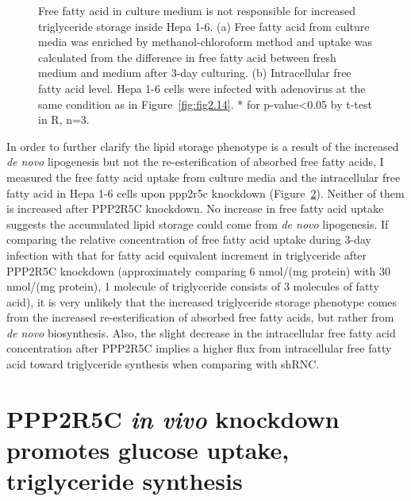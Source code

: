 \begin{figure}[!tb]
\begin{subfigure}[t]{0.48\textwidth}
    \label{fig:fig2.19b}
	\end{subfigure}
\caption[Free Fatty Acid uptake is not responsible for increased triglyceride]{\footnotesize Free fatty acid in culture medium is not responsible for increased triglyceride storage inside Hepa 1-6. (a) Free fatty acid from culture media was enriched by methanol-chloroform method \cite{folch_simple_1957} and uptake was calculated from the difference in free fatty acid between fresh medium and medium after 3-day culturing. (b) Intracellular free fatty acid level. Hepa 1-6 cells were infected with adenovirus at the same condition as in Figure~\ref{fig:fig2.14}. * for p-value<0.05 by t-test in R, n=3.}
\label{fig:fig2.19}
\end{figure}

In order to further clarify the lipid storage phenotype is a result of the increased \textit{de novo} lipogenesis but not the re-esterification of absorbed free fatty acids, I measured the free fatty acid uptake from culture media and the intracellular free fatty acid in Hepa 1-6 cells upon \gls{ppp2r5c} knockdown (Figure~\ref{fig:fig2.19}). Neither of them is increased after PPP2R5C knockdown. No increase in free fatty acid uptake suggests the accumulated lipid storage could come from \textit{de novo} lipogenesis. If comparing the relative concentration of free fatty acid uptake during 3-day infection with that for fatty acid equivalent increment in triglyceride after PPP2R5C knockdown (approximately comparing 6 nmol/(mg protein) with 30 nmol/(mg protein), 1 molecule of triglyceride consists of 3 molecules of fatty acid), it is very unlikely that the increased triglyceride storage phenotype comes from the increased re-esterification of absorbed free fatty acids, but rather from \textit{de novo} biosynthesis. Also, the slight decrease in the intracellular free fatty acid concentration after PPP2R5C implies a higher flux from intracellular free fatty acid toward triglyceride synthesis when comparing with shRNC.


\section{PPP2R5C \textit{in vivo} knockdown promotes glucose uptake, triglyceride synthesis}

